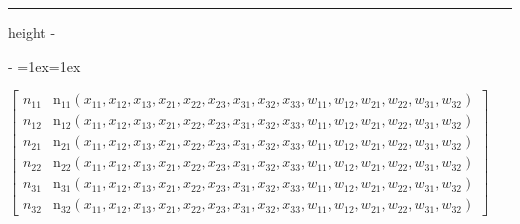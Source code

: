 \documentclass[letterpaper,10pt,english]{sphinxmanual}
\makeatletter
\newenvironment{nbsphinxfancyoutput}{%
    \let\sphinxincludegraphics\nbsphinxincludegraphics
    \nbsphinx@image@maxheight\textheight
    \advance\nbsphinx@image@maxheight -2\fboxsep   %
    \advance\nbsphinx@image@maxheight -2\fboxrule  %
    \advance\nbsphinx@image@maxheight -\baselineskip
\def\nbsphinxfcolorbox{\spx@fcolorbox{nbsphinx-code-border}{white}}%
\def\FrameCommand{\nbsphinxfcolorbox\nbsphinxfancyaddprompt\@empty}%
\def\FirstFrameCommand{\nbsphinxfcolorbox\nbsphinxfancyaddprompt\sphinxVerbatim@Continues}%
\def\MidFrameCommand{\nbsphinxfcolorbox\sphinxVerbatim@Continued\sphinxVerbatim@Continues}%
\def\LastFrameCommand{\nbsphinxfcolorbox\sphinxVerbatim@Continued\@empty}%
\MakeFramed{\advance\hsize-\width\@totalleftmargin\z@\linewidth\hsize\@setminipage}%
\lineskip=1ex\lineskiplimit=1ex\raggedright%
}{\par\unskip\@minipagefalse\endMakeFramed}
\def\nbsphinxfancyaddprompt{\ifvoid\nbsphinxpromptbox\else
    \kern\fboxrule\kern\fboxsep
    \copy\nbsphinxpromptbox
    \kern-\ht\nbsphinxpromptbox\kern-\dp\nbsphinxpromptbox
    \kern-\fboxsep\kern-\fboxrule\nointerlineskip
    \fi}
\newlength\nbsphinxcodecellspacing
\newcommand*{\nbsphinxincludegraphics}[2][]{%
    \gdef\spx@includegraphics@options{#1}%
    \setbox\spx@image@box\hbox{\texttt{[image: \#2]}}%
    \in@false
    \ifdim \wd\spx@image@box>\linewidth
      \g@addto@macro\spx@includegraphics@options{,width=\linewidth}%
      \in@true
    \fi
    \ifdim \ht\spx@image@box>\nbsphinx@image@maxheight
      \g@addto@macro\spx@includegraphics@options{,height=\nbsphinx@image@maxheight}%
      \in@true
    \fi
    \ifin@
      \g@addto@macro\spx@includegraphics@options{,keepaspectratio}%
    \fi
    \setbox\spx@image@box\box\voidb@x %
    \expandafter\includegraphics\expandafter[\spx@includegraphics@options]{#2}%
}%
\makeatother
\begin{document}
{
\begin{sphinxVerbatim}[commandchars=\\\{\}]
\llap{\color{nbsphinxin}[37]:\,\hspace{\fboxrule}\hspace{\fboxsep}}  \PYG{p}{[}\PYG{p}{[}\PYG{p}{[} \PYG{p}{]}          \PYG{p}{]}    \PYG{p}{]}

  

\end{sphinxVerbatim}
}

\hrule height -\fboxrule\relax
\vspace{\nbsphinxcodecellspacing}

\savebox\nbsphinxpromptbox[0pt][r]{\color{nbsphinxout}\Verb|\strut{[37]:}\,|}

\begin{nbsphinxfancyoutput}
$\displaystyle \left[\begin{matrix}n_{11} & \operatorname{n_{11}}{\left(x_{11},x_{12},x_{13},x_{21},x_{22},x_{23},x_{31},x_{32},x_{33},w_{11},w_{12},w_{21},w_{22},w_{31},w_{32} \right)}\\n_{12} & \operatorname{n_{12}}{\left(x_{11},x_{12},x_{13},x_{21},x_{22},x_{23},x_{31},x_{32},x_{33},w_{11},w_{12},w_{21},w_{22},w_{31},w_{32} \right)}\\n_{21} & \operatorname{n_{21}}{\left(x_{11},x_{12},x_{13},x_{21},x_{22},x_{23},x_{31},x_{32},x_{33},w_{11},w_{12},w_{21},w_{22},w_{31},w_{32} \right)}\\n_{22} & \operatorname{n_{22}}{\left(x_{11},x_{12},x_{13},x_{21},x_{22},x_{23},x_{31},x_{32},x_{33},w_{11},w_{12},w_{21},w_{22},w_{31},w_{32} \right)}\\n_{31} & \operatorname{n_{31}}{\left(x_{11},x_{12},x_{13},x_{21},x_{22},x_{23},x_{31},x_{32},x_{33},w_{11},w_{12},w_{21},w_{22},w_{31},w_{32} \right)}\\n_{32} & \operatorname{n_{32}}{\left(x_{11},x_{12},x_{13},x_{21},x_{22},x_{23},x_{31},x_{32},x_{33},w_{11},w_{12},w_{21},w_{22},w_{31},w_{32} \right)}\end{matrix}\right]$
\end{nbsphinxfancyoutput}
\end{document}
